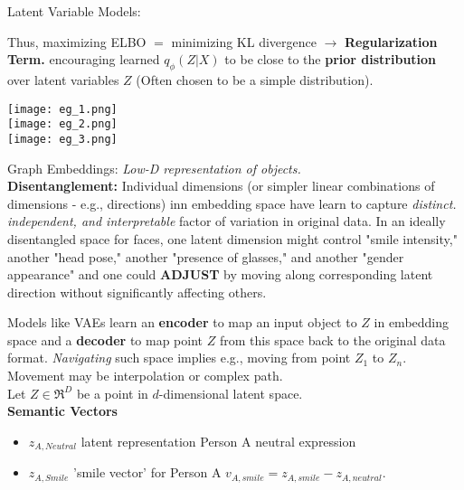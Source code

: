 \documentclass[twocolumn]{article}
\begin{document}
\begin{literaturepaper}{Latent Variable Models:}
\begin{enumerate}
    Thus, maximizing ELBO $=$ minimizing KL divergence $\rightarrow$ \textbf{Regularization Term.} encouraging learned $q_\phi(Z|X)$ to be close to the \textbf{prior distribution} over latent variables $Z$ (Often chosen to be a simple distribution).
\end{enumerate}

\texttt{[image: eg\_1.png]}\\

\texttt{[image: eg\_2.png]}\\

\texttt{[image: eg\_3.png]}\\


\end{literaturepaper}

\begin{literaturepaper}{Graph Embeddings:}
\label{background-info-3}
\small
\textit{Low-D representation of objects.} \\

\textbf{Disentanglement:} Individual dimensions (or simpler linear combinations of dimensions - e.g., directions) inn embedding space have learn to capture \textit{distinct. independent, and interpretable} factor of variation in original data. In an ideally disentangled space for faces, one latent dimension might control "smile intensity," another "head pose," another "presence of glasses," and another "gender appearance" and one could \textbf{ADJUST} by moving along corresponding latent direction without significantly affecting others.  

Models like VAEs learn an \textbf{encoder} to map an input object to $Z$ in embedding space and a \textbf{decoder} to map point $Z$ from this space back to the original data format. \textit{Navigating} such space implies e.g., moving from point $Z_1$ to $Z_n$. Movement may be interpolation or complex path.\\

Let $Z \in \Re^D$ be a point in $d$-dimensional latent space. \\

\textbf{Semantic Vectors}
\begin{itemize}
    \item $z_{A,Neutral}$ latent representation Person A neutral expression
    \item $z_{A,Smile}$ 
    \itemn 'smile vector' for Person A $v_{A,smile} = z_{A,smile} - z_{A,neutral}$.
\end{itemize}


\end{literaturepaper}
\end{document}
